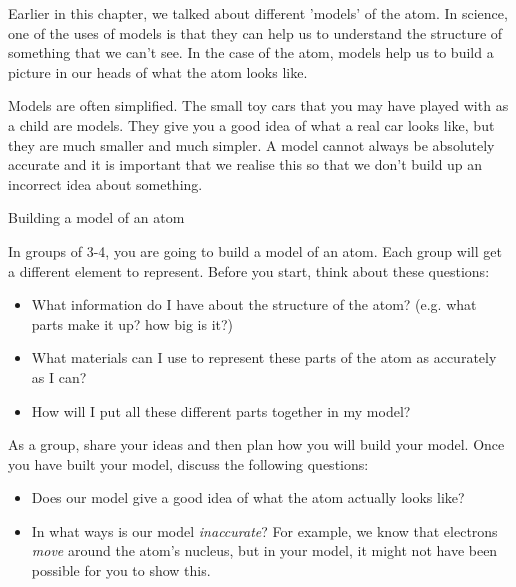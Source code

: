             \label{m38741*id260472}Earlier in this chapter, we talked about different 'models' of the atom. In science, one of the uses of models is that they can help us to understand the structure of something that we can't see. In the case of the atom, models help us to build a picture in our heads of what the atom looks like.\par 
        \label{m38741*id260480}Models are often simplified. The small toy cars that you may have played with as a child are models. They give you a good idea of what a real car looks like, but they are much smaller and much simpler. A model cannot always be absolutely accurate and it is important that we realise this so that we don't build up an incorrect idea about something.\par 
\begin{groupdiscussion}{Building a model of an atom }
            \nopagebreak
\begin{multicols}{2}
        \label{m38741*id260488}In groups of 3-4, you are going to build a model of an atom. Each group will get a different element to represent. Before you start, think about these questions:\par 
        \label{m38741*id260495}\begin{itemize}[noitemsep]
            \label{m38741*uid114}\item What information do I have about the structure of the atom? (e.g. what parts make it up? how big is it?)
\label{m38741*uid115}\item What materials can I use to represent these parts of the atom as accurately as I can?
\label{m38741*uid116}\item How will I put all these different parts together in my model?
\end{itemize}
        \label{m38741*id260537}As a group, share your ideas and then plan how you will build your model. Once you have built your model, discuss the following questions:\par 
        \label{m38741*id260542}\begin{itemize}[noitemsep]
            \label{m38741*uid117}\item Does our model give a good idea of what the atom actually looks like?
\label{m38741*uid118}\item In what ways is our model \textsl{inaccurate}? For example, we know that electrons \textsl{move} around the atom's nucleus, but in your model, it might not have been possible for you to show this.

\end{itemize}
\end{multicols}
\end{groupdiscussion}
